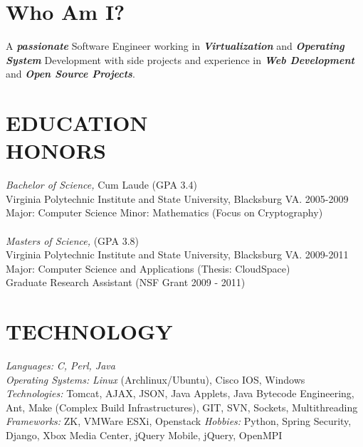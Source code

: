\documentclass[line,margin]{res}
\begin{document}
\address{2132 Sterling Green Dr, Morrisville, NC 27560}
\address{Email: vtwoods@gmail.com --- Cell: (703)475-1337}

 
\begin{resume}
 
\section{Who Am I?} A \textbf{\emph{passionate}} Software Engineer working in \textbf{\emph{Virtualization}} and \textbf{\emph{Operating System}} Development with side projects and experience in \textbf{\emph{Web Development}} and \textbf{\emph{Open Source Projects}}. 
 
 
\section{EDUCATION \\ HONORS} {\sl Bachelor of Science,} Cum Laude (GPA 3.4) \\
                Virginia Polytechnic Institute and State University, Blacksburg VA. 2005-2009 \\
                Major: Computer Science Minor: Mathematics (Focus on Cryptography)\\
\\
                {\sl Masters of Science,} (GPA 3.8) \\
                Virginia Polytechnic Institute and State University, Blacksburg VA. 2009-2011 \\
                Major: Computer Science and Applications (Thesis:  CloudSpace) \\
                Graduate Research Assistant (NSF Grant 2009 - 2011)
 
\section{TECHNOLOGY} {\sl Languages:} \emph{C, Perl, Java} \\
                {\sl Operating Systems:} \emph{Linux} (Archlinux/Ubuntu), Cisco IOS, Windows
                {\sl Technologies:} Tomcat, AJAX, JSON, Java Applets, Java Bytecode Engineering, Ant, Make (Complex Build Infrastructures), GIT, SVN, Sockets, Multithreading
                {\sl Frameworks:} ZK, VMWare ESXi, Openstack
                {\sl Hobbies:} Python, Spring Security, Django, Xbox Media Center, jQuery Mobile, jQuery, OpenMPI
 

\end{resume}
\end{document}
